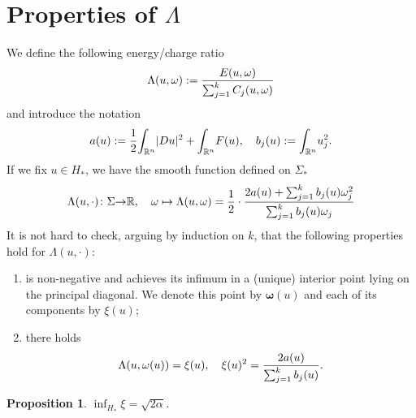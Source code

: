 \documentclass[a4paper,12pt,oneside]{amsart}
\newtheorem{prop}{Proposition}
\theoremstyle{definition}
\theoremstyle{remark}
\theoremstyle{theorem}
\begin{document}
\section{Properties of $ \Lambda $}
\noindent We define the following energy/charge ratio
\[
\Lambda(u,{\mathbf{\omega}}) := \frac{E(u,{\mathbf{\omega}})}{\sum_{j = 1} \sp k C_j (u,{\mathbf{\omega}})}
\]
and introduce the notation
\[
a(u) := \frac{1}{2}{\int_{{\mathbb{R}}\sp{n}}} |{D} u|\sp 2 + {\int_{{\mathbb{R}}\sp{n}}}{F}(u),\quad b_j (u) := 
{\int_{{\mathbb{R}}\sp{n}}} u_j \sp 2.
\]
If we fix $ u\in H_* $, we have the smooth function defined on
$ \Sigma_* $
\[
\Lambda(u,\cdot)\colon\Sigma{\rightarrow}{\mathbb{R}},\quad
{\mathbf{\omega}}\mapsto \Lambda(u,{\mathbf{\omega}}) = \frac{1}{2}\cdot 
\frac{2a(u) + \sum_{j = 1}\sp k b_j (u) {\mathbf{\omega}}_j \sp 2}{\sum_{j = 1} \sp k b_j (u){\mathbf{\omega}}_j}
\]
It is not hard to check, arguing by induction on $ k $, 
that the following properties hold for $ \Lambda(u,\cdot) $:
\begin{enumerate}
\item is non-negative and achieves its infimum in a (unique) interior point
lying on the principal diagonal. We denote this point by $ {\mathbf{\omega}}(u) $ and
each of its components by $ \xi(u) $;
\item there holds
\[
\Lambda(u,{\mathbf{\omega}}(u)) = \xi(u),\quad \xi(u)\sp 2 = 
\frac{2a(u)}{\sum_{j = 1}\sp k b_j(u)}.
\]
\end{enumerate}
\begin{prop}
\label{prop:hylomorphy}
$ \inf_{H_*} \xi = \sqrt{2\alpha} $.
\end{prop}
\end{document}
